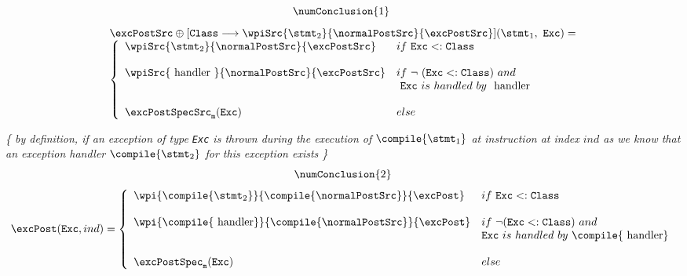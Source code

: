 \begin{pogEquiv}
\begin{description}
\begin{description}

$$\numConclusion{1} \   $$
$$ \begin{array}{l}
\excPostSrc \oplus [\texttt{Class} \longrightarrow \wpiSrc{\stmt_2}{ \normalPostSrc}{\excPostSrc}  ]  (\stmt_1 , \mbox{ \rm \texttt{Exc}})  =\\
\left\{\begin{array}{ll} 
     \wpiSrc{\stmt_2}{ \normalPostSrc}{\excPostSrc} & if \ \texttt{Exc} <: \texttt{Class} \\
& \\
     \wpiSrc{ \mbox{ \rm handler } }{ \normalPostSrc}{\excPostSrc} & if \  \neg \mbox{ \rm (\texttt{Exc}} <: \texttt{Class} ) \ and \ \\
                                                    & \mbox{ \rm \texttt{Exc}} \ is \ handled \ by \  \mbox{ \rm handler} \\
& \\
      \excPostSpecSrc_{\tt{m}}(\texttt{Exc} )        & else  
\end{array} \right.
\end{array}  $$

\textit{\{ by definition, if an exception of type \mbox{\rm \texttt{Exc}} is thrown  during the execution of $\compile{\stmt_1}$ at instruction at index $ind$ as we know that
an exception handler $\compile{\stmt_2}$ for this exception exists \} }  
$$ \numConclusion{2} $$
$$\excPost ( \mbox{\rm \texttt{Exc}}, ind ) =
\left\{\begin{array}{ll} 
\wpi{\compile{\stmt_2}}{ \compile{\normalPostSrc}}{\excPost}  & if \ \mbox{\rm \texttt{Exc}}  <: \mbox{\rm \texttt{Class}} \\
& \\
\wpi{\compile{\mbox{ \rm handler} }}{ \compile{\normalPostSrc}}{\excPost}  & if \ \neg ( \mbox{\rm \texttt{Exc}} <: \mbox{\rm \texttt{Class}} ) \ and \ \\
                                                              &  \mbox{\rm \texttt{Exc}} \ is \ handled \ by \  \compile{\mbox{ \rm handler} }  \\
& \\
 \excPostSpec_{\tt{m}}( \mbox{\rm \texttt{Exc}}  )        & else  
\end{array}\right.   $$



\end{description}
\end{description}
\end{pogEquiv}
